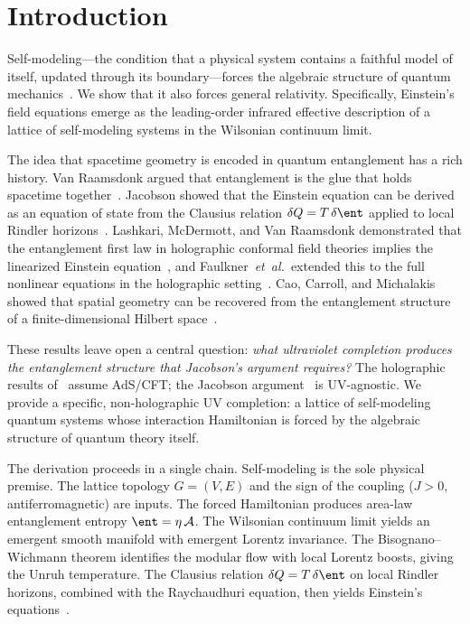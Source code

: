\section{Introduction}
\label{sec:introduction}

Self-modeling---the condition that a physical system contains a faithful
model of itself, updated through its boundary---forces the algebraic
structure of quantum mechanics~\cite{Paper5}. We show that it also forces
general relativity. Specifically, Einstein's field equations emerge as the
leading-order infrared effective description of a lattice of self-modeling
systems in the Wilsonian continuum limit.

The idea that spacetime geometry is encoded in quantum entanglement has a
rich history. Van Raamsdonk argued that entanglement is the glue that
holds spacetime together~\cite{VanRaamsdonk2010}. Jacobson showed that the
Einstein equation can be derived as an equation of state from the Clausius
relation $\delta Q = T\,\delta\ent$ applied to local Rindler
horizons~\cite{Jacobson1995}. Lashkari, McDermott, and Van Raamsdonk
demonstrated that the entanglement first law in holographic conformal
field theories implies the linearized Einstein equation~\cite{LMVR2014},
and Faulkner~\textit{et~al.}\ extended this to the full nonlinear
equations in the holographic setting~\cite{Faulkner2014}. Cao, Carroll,
and Michalakis showed that spatial geometry can be recovered from the
entanglement structure of a finite-dimensional Hilbert
space~\cite{CCM2017}.

These results leave open a central question: \emph{what ultraviolet
completion produces the entanglement structure that Jacobson's argument
requires?} The holographic results of~\cite{LMVR2014,Faulkner2014} assume
AdS/CFT; the Jacobson argument~\cite{Jacobson1995} is UV-agnostic. We
provide a specific, non-holographic UV completion: a lattice of
self-modeling quantum systems whose interaction Hamiltonian is forced by
the algebraic structure of quantum theory itself.

The derivation proceeds in a single chain. Self-modeling is the sole
physical premise. The lattice topology $G = (V, E)$ and the sign of
the coupling ($J > 0$, antiferromagnetic) are inputs. The forced
Hamiltonian produces area-law entanglement entropy
$\ent = \eta\,\mathcal{A}$. The Wilsonian continuum limit yields an
emergent smooth manifold with emergent Lorentz invariance. The
Bisognano--Wichmann theorem identifies the modular flow with local
Lorentz boosts, giving the Unruh temperature. The Clausius relation
$\delta Q = T\,\delta\ent$ on local Rindler horizons, combined with
the Raychaudhuri equation, then yields Einstein's
equations~\cite{Jacobson1995}.

